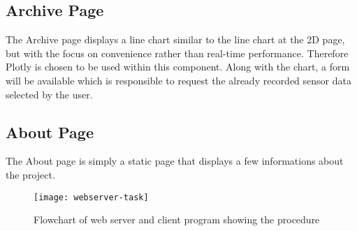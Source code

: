 \subsection{Archive Page}
The Archive page displays a line chart similar to the line chart at the 2D page, but with the focus on convenience rather than real-time performance. Therefore Plotly is chosen to be used within this component. Along with the chart, a form will be available which is responsible to request the already recorded sensor data selected by the user.

\subsection{About Page}
The About page is simply a static page that displays a few informations about the project.


\begin{figure}[H]
    \centering
    \texttt{[image: webserver-task]}
    \caption{Flowchart of web server and client program showing the procedure}
    \label{fig:webserver-program-flow}
\end{figure}
